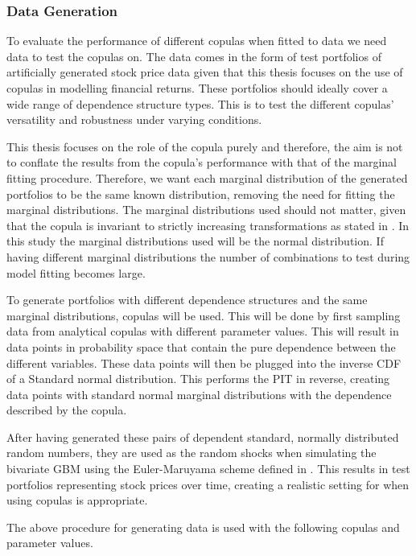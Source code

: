 \subsubsection{Data Generation}
To evaluate the performance of different copulas when fitted to data we need data to test the copulas on. The data comes in the form of test portfolios of artificially generated stock price data given that this thesis focuses on the use of copulas in modelling financial returns. These portfolios should ideally cover a wide range of dependence structure types. This is to test the different copulas' versatility and robustness under varying conditions. 

This thesis focuses on the role of the copula purely and therefore, the aim is not to conflate the results from the copula's performance with that of the marginal fitting procedure. Therefore, we want each marginal distribution of the generated portfolios to be the same known distribution, removing the need for fitting the marginal distributions. The marginal distributions used should not matter, given that the copula is invariant to strictly increasing transformations as stated in . In this study the marginal distributions used will be the normal distribution. If having different marginal distributions the number of combinations to test during model fitting becomes large.  

To generate portfolios with different dependence structures and the same marginal distributions, copulas will be used. This will be done by first sampling data from analytical copulas with different parameter values. This will result in data points in probability space that contain the pure dependence between the different variables. These data points will then be plugged into the inverse \gls{CDF} of a Standard normal distribution. This performs the \gls{PIT} in reverse, creating data points with standard normal marginal distributions with the dependence described by the copula. 

After having generated these pairs of dependent standard, normally distributed random numbers, they are used as the random shocks when simulating the bivariate \gls{GBM} using the Euler-Maruyama scheme defined in . This results in test portfolios representing stock prices over time, creating a realistic setting for when using copulas is appropriate. 

The above procedure for generating data is used with the following copulas and parameter values. 

